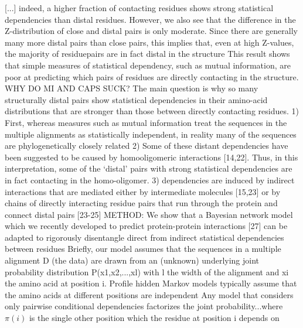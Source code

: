 	[...] indeed, a higher fraction of contacting residues shows strong statistical dependencies than distal residues. However, we also see that the difference in the Z-distribution of close and distal pairs is only moderate. \cite{burger2010disentangling}
	Since there are generally many more distal pairs than close pairs, this implies that, even at high Z-values, the majority of residuepairs are in fact distal in the structure \cite{burger2010disentangling}
	This result shows that simple measures of statistical dependency, such as mutual information, are poor at predicting which pairs of residues are directly contacting in the structure. \cite{burger2010disentangling}
WHY DO MI AND CAPS SUCK?  \cite{burger2010disentangling}
	The main question is why so many structurally distal pairs show statistical dependencies in their amino-acid distributions that are stronger than those between directly contacting residues. \cite{burger2010disentangling}
	1) First, whereas measures such as mutual information treat the sequences in the multiple alignments as statistically independent, in reality many of the sequences are phylogenetically closely related \cite{burger2010disentangling}
	2) Some of these distant dependencies have been suggested to be caused by homooligomeric interactions [14,22]. Thus, in this interpretation, some of the `distal' pairs with strong statistical dependencies are in fact contacting in the homo-oligomer.  \cite{burger2010disentangling}
	3) dependencies are induced by indirect interactions that are mediated either by intermediate molecules [15,23] or by chains of directly interacting residue pairs that run through the protein and connect distal pairs [23-25] \cite{burger2010disentangling}
METHOD: \cite{burger2010disentangling}
	We show that a Bayesian network model which we recently developed to predict protein-protein interactions [27] can be adapted to rigorously disentangle direct from indirect statistical dependencies between residues \cite{burger2010disentangling}
	Briefly, our model assumes that the sequences in a multiple alignment D (the data) are drawn from an (unknown) underlying joint probability distribution P(x1,x2,...,xl) with l the width of the alignment and xi the amino acid at position i. Profile hidden Markov models typically assume that the amino acids at different positions are independent  \cite{burger2010disentangling}
	Any model that considers only pairwise conditional dependencies factorizes the joint probability...where $\pi(i)$ is the single other position which the residue at position i depends on \cite{burger2010disentangling}
